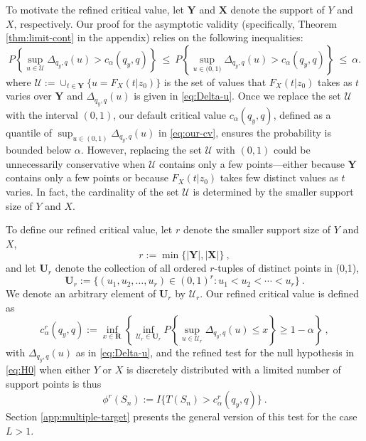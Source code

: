 \documentclass[11pt]{article}
\numberwithin{equation}{section}
\begin{document}
To motivate the refined critical value, let $\mathbf Y$ and $\mathbf X$ denote the support of $Y$ and $X$, respectively. 
Our proof for the asymptotic validity (specifically, Theorem \ref{thm:limit-cont} in the appendix) relies on the following inequalities:
\begin{equation*}
P\left\lbrace \sup_{u\in \mathcal{U}}\Delta_{q_y,q}(u) > c_{\alpha}(q_y,q) \right\rbrace ~\leq ~ P\left\lbrace \sup_{u\in\mathbf (0,1)}\Delta_{q_y,q}(u) > c_{\alpha}(q_y,q) \right\rbrace~\leq ~ \alpha.
\end{equation*}
where $\mathcal{U} := \cup_{t\in \mathbf Y}\{u =  F_X(t|z_{0}) \}$ is the set of values that $F_X(t|z_{0})$ takes as $t$ varies over $\mathbf Y$ and $\Delta_{q_y,q}(u) $ is given in \eqref{eq:Delta-u}. Once we replace the set $ \mathcal{U}$ with the interval $(0,1)$, our default critical value $c_{\alpha}(q_y,q)$, defined as a quantile of $\sup_{u\in(0,1)}\Delta_{q_y,q}(u)$ in \eqref{eq:our-cv}, ensures the probability is bounded below $\alpha.$ However, replacing the set $ \mathcal{U}$ with $(0,1)$ could be unnecessarily conservative when $ \mathcal{U}$ contains only a few points---either because $\mathbf Y$ contains only a few points or because $F_X(t|z_{0})$ takes few distinct values as $t$ varies. In fact, the cardinality of the set $ \mathcal{U}$ is determined by the smaller support size of $Y$ and $X$.

To define our refined critical value, let $r$ denote the smaller support size of $Y$ and $X$, 
\begin{equation*}
    r := \min \{|\mathbf Y|,|\mathbf X|\}~,
\end{equation*}
and let $\mathbf{U}_r$ denote the collection of all ordered $r$-tuples of distinct points in (0,1),
\begin{equation*}
   \mathbf{U}_r := \{(u_1,u_2,\dots,u_r)\in (0,1)^r : u_1 < u_2 < \cdots < u_r \}~.
\end{equation*}
We denote an arbitrary element of $\mathbf{U}_r$ by $\mathcal{U}_r$. Our refined critical value is defined as 
\begin{equation}\label{eq:our-cv-r}
    c^{r}_{\alpha}(q_y,q) := \inf_{x\in\mathbf R} \left\{\inf_{\mathcal{U}_r\in  \mathbf{U}_r }
    P\left\lbrace \sup_{u\in\mathcal{U}_r} \Delta_{q_y,q}(u)  \le x \right\rbrace \ge 1-\alpha \right\}~,
\end{equation} 
with $\Delta_{q_y,q}(u)$ as in \eqref{eq:Delta-u}, and the refined test for the null hypothesis in \eqref{eq:H0} when either $Y$ or $X$  is discretely distributed with a limited number of support points is thus 
\begin{equation}\label{eq:our-test-r}
  \phi^{r}(S_n) := I\{T(S_n)>c^{r}_{\alpha}(q_y,q)\}~.
\end{equation}
Section \ref{app:multiple-target} presents the general version of this test for the case $L>1$.
\end{document}

